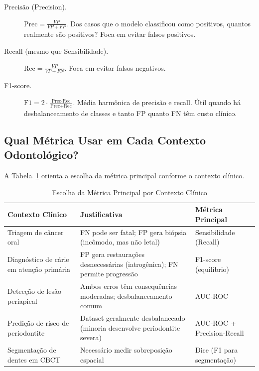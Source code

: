 \begin{description}
    \item[Precisão (Precision).] $\text{Prec} = \frac{VP}{VP + FP}$. Dos casos que o modelo classificou como positivos, quantos realmente são positivos? Foca em evitar falsos positivos.
    
    \item[Recall (mesmo que Sensibilidade).] $\text{Rec} = \frac{VP}{VP + FN}$. Foca em evitar falsos negativos.
    
    \item[F1-score.] $\text{F1} = 2 \cdot \frac{\text{Prec} \cdot \text{Rec}}{\text{Prec} + \text{Rec}}$. Média harmônica de precisão e recall. Útil quando há desbalanceamento de classes e tanto FP quanto FN têm custo clínico.
\end{description}

\subsection{Qual Métrica Usar em Cada Contexto Odontológico?}

A Tabela~\ref{tab:metricas-contexto} orienta a escolha da métrica principal conforme o contexto clínico.

\begin{table}[H]
  \centering
  \caption{Escolha da Métrica Principal por Contexto Clínico}
  \label{tab:metricas-contexto}
  \begin{tabularx}{\textwidth}{p{3.5cm}Xp{2.5cm}}
    \toprule
    \textbf{Contexto Clínico} & \textbf{Justificativa} & \textbf{Métrica Principal} \\
    \midrule
    Triagem de câncer oral & FN pode ser fatal; FP gera biópsia (incômodo, mas não letal) & Sensibilidade (Recall) \\
    Diagnóstico de cárie em atenção primária & FP gera restaurações desnecessárias (iatrogênica); FN permite progressão & F1-score (equilíbrio) \\
    Detecção de lesão periapical & Ambos erros têm consequências moderadas; desbalanceamento comum & AUC-ROC \\
    Predição de risco de periodontite & Dataset geralmente desbalanceado (minoria desenvolve periodontite severa) & AUC-ROC + Precision-Recall \\
    Segmentação de dentes em CBCT & Necessário medir sobreposição espacial & Dice (F1 para segmentação) \\
    \bottomrule
  \end{tabularx}
\end{table}


